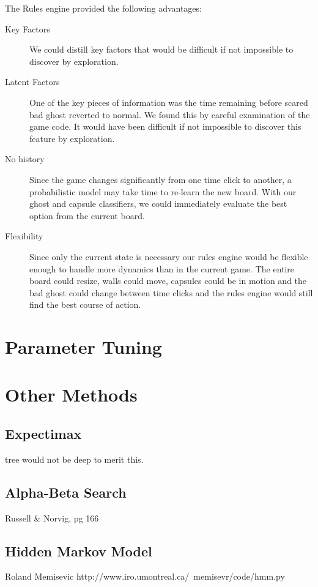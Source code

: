 \documentclass[11pt, oneside]{article}   	%
\begin{document}
The Rules engine provided the following advantages:
\begin{description}
	\item[Key Factors]We could distill key factors that would be difficult if not impossible to discover by exploration.
	\item[Latent Factors]One of the key pieces of information was the time remaining before scared bad ghost reverted to normal. We found this by careful examination of the game code. It would have been difficult if not impossible to discover this feature by exploration.
	\item[No history]Since the game changes significantly from one time click to another, a probabilistic model may take time to re-learn the new board. With our ghost and capsule classifiers, we could immediately evaluate the best option from the current board.
	\item[Flexibility]Since only the current state is necessary our rules engine would be flexible enough to handle more dynamics than in the current game. The entire board could resize,  walls could move, capsules could be in motion and the bad ghost could change between time clicks and the rules engine would still find the best course of action.
\end{description}

\section{Parameter Tuning}

\section{Other Methods}
\subsection{Expectimax}
tree would not be deep to merit this. 

\subsection{Alpha-Beta Search}
Russell \& Norvig, pg 166

\subsection{Hidden Markov Model}
 Roland Memisevic
 http://www.iro.umontreal.ca/~memisevr/code/hmm.py
\end{document}
